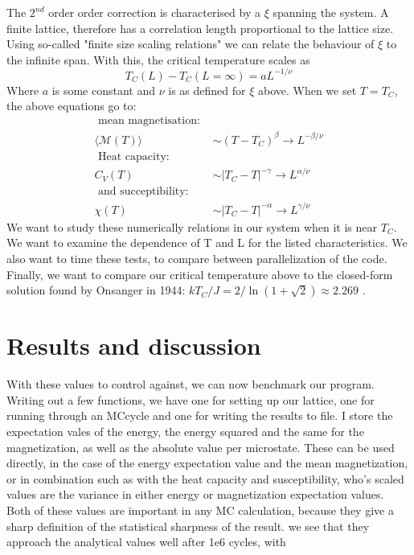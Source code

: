 \documentclass[10pt, twocolumn]{revtex4-1}
\begin{document}
The $2^{nd}$ order order correction is characterised by a $\xi$ spanning the system. A finite lattice, therefore has a correlation length proportional to
the lattice size. Using so-called "finite size scaling relations" we can relate the behaviour of $\xi$ to the infinite span. With this, the critical
temperature scales as
\[ T _ { C } ( L ) - T _ { C } ( L = \infty ) = a L ^ { - 1 / \nu } \]
Where $a$ is some constant and $\nu$ is as defined for $\xi$ above. When we set $T = T_C$, the above equations go to:
\begin{align*}
    \text{ mean magnetisation: } \\
    \langle \mathcal { M } ( T ) \rangle &\sim \left( T - T _ { C } \right) ^ { \beta } \rightarrow L ^ { - \beta / \nu }\\
    \text{ Heat capacity: } \\
    C _ { V } ( T ) &\sim \left| T _ { C } - T \right| ^ { - \gamma } \rightarrow L ^ { \alpha / \nu }\\
    \text{ and succeptibility: } \\
    \chi ( T ) &\sim \left| T _ { C } - T \right| ^ { - \alpha } \rightarrow L ^ { \gamma / \nu }
\end{align*}
We want to study these numerically relations in our system when it is near $T_C$. We want to examine the dependence of T and L for the listed characteristics.
We also want to time these tests, to compare between parallelization of the code. Finally, we want to compare our critical temperature above to the
closed-form solution found by Onsanger in 1944: $k T _ { C } / J = 2 / \ln ( 1 + \sqrt { 2 } ) \approx 2.269$ \cite{PhysRev.65.117}.


\section{Results and discussion}

With these values to control against, we can now benchmark our program. Writing out a few functions, we have one for setting up our lattice, one for running
through an MCcycle and one for writing the results to file. I store the expectation vales of the energy, the energy squared and the same for the magnetization,
as well as the absolute value per microstate. These can be used directly, in the case of the energy expectation value and the mean magnetization, or in
combination such as with the heat capacity and susceptibility, who's scaled values are the variance in either energy or magnetization expectation values. Both
of these values are important in any MC calculation, because they give a sharp definition of the statistical sharpness of the result.
we see that they approach the analytical values well after 1e6 cycles, with %
\end{document}

